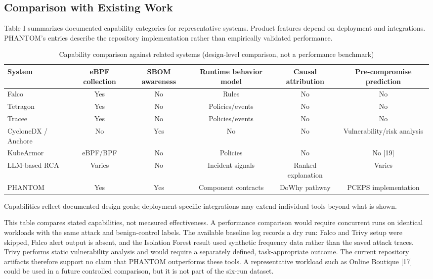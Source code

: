 \documentclass[conference]{IEEEtran}
\begin{document}
\subsection{Comparison with Existing Work}
Table I summarizes documented capability categories for representative systems. Product features depend on deployment and integrations. PHANTOM's entries describe the repository implementation rather than empirically validated performance.
\begin{table}[t]\caption{Capability comparison against related systems (design-level comparison, not a performance benchmark)}\label{tab:positioning}\centering
\begin{tabular}{lccccc}\toprule
System & eBPF collection & SBOM awareness & Runtime behavior model & Causal attribution & Pre-compromise prediction\\\midrule
Falco & Yes & No & Rules & No & No\\
Tetragon & Yes & No & Policies/events & No & No\\
Tracee & Yes & No & Policies/events & No & No\\
CycloneDX / Anchore & No & Yes & No & No & Vulnerability/risk analysis\\
KubeArmor & eBPF/BPF & No & Policies & No & No [19]\\
LLM-based RCA & Varies & No & Incident signals & Ranked explanation & Varies\\
PHANTOM & Yes & Yes & Component contracts & DoWhy pathway & PCEPS implementation\\\bottomrule
\end{tabular}
\par{\footnotesize Capabilities reflect documented design goals; deployment-specific integrations may extend individual tools beyond what is shown.}
\end{table}

This table compares stated capabilities, not measured effectiveness. A performance comparison would require concurrent runs on identical workloads with the same attack and benign-control labels. The available baseline log records a dry run: Falco and Trivy setup were skipped, Falco alert output is absent, and the Isolation Forest result used synthetic frequency data rather than the saved attack traces. Trivy performs static vulnerability analysis and would require a separately defined, task-appropriate outcome. The current repository artifacts therefore support no claim that PHANTOM outperforms these tools. A representative workload such as Online Boutique [17] could be used in a future controlled comparison, but it is not part of the six-run dataset.
\end{document}

